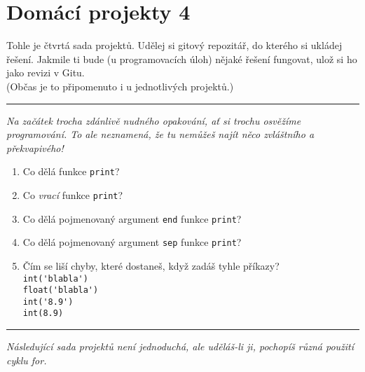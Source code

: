 \documentclass[a4paper,10pt]{article}
\newcommand\plsetno{4}
\newcommand\startsection[1]{
     \vspace{0.2ex}
    \hrule
    {\fontspec{Oxygen} \tiny
     \vspace{-1ex}
     \emph{#1}
     \vspace{-1.5em}
    }
}
\begin{document}
\section*{Domácí projekty {\plsetno}}

Tohle je čtvrtá sada projektů. Udělej si gitový repozitář, do kterého si ukládej řešení.
Jakmile ti bude (u programovacích úloh) nějaké řešení fungovat, ulož si ho jako revizi v Gitu.
\\(Občas je to připomenuto i u jednotlivých projektů.)

\startsection{Na začátek trocha zdánlivě nudného opakování, ať si trochu osvěžíme programování.
To ale neznamená, že tu nemůžeš najít něco zvláštního a překvapivého!}

\begin{enumerate}
\item Co dělá funkce \verb+print+?

\item Co \emph{vrací} funkce \verb+print+?

\item Co dělá pojmenovaný argument \texttt{end} funkce \verb+print+?

\item Co dělá pojmenovaný argument \texttt{sep} funkce \verb+print+?

\item Čím se liší chyby, které dostaneš, když zadáš tyhle příkazy?
    \\\verb+int('blabla')+
    \\\verb+float('blabla')+
    \\\verb+int('8.9')+
    \\\verb+int(8.9)+

\end{enumerate}

\startsection{Následující sada projektů není jednoduchá, ale uděláš-li ji, pochopíš různá použití cyklu for.}
\end{document}
